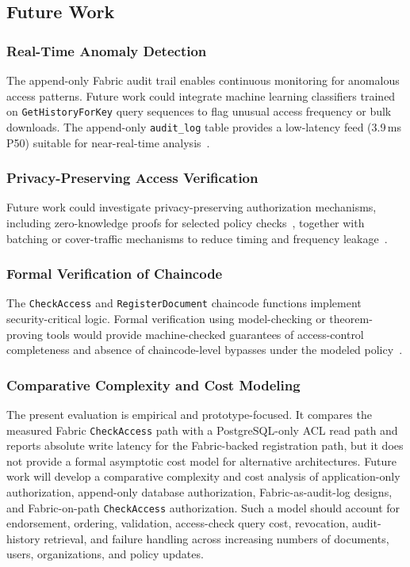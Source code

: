 \documentclass{ieeeaccess}
\begin{document}
\subsection{Future Work}
\label{sec:future_work}

\subsubsection{Real-Time Anomaly Detection}
The append-only Fabric audit trail enables continuous monitoring for
anomalous access patterns. Future work could integrate machine
learning classifiers trained on \texttt{GetHistoryForKey} query
sequences to flag unusual access frequency or bulk downloads. The
append-only \texttt{audit\_log} table provides a low-latency feed
(3.9\,ms P50) suitable for near-real-time
analysis~\cite{siddamsetti2024anomaly}.

\subsubsection{Privacy-Preserving Access Verification}
Future work could investigate privacy-preserving authorization
mechanisms, including zero-knowledge proofs for selected policy
checks~\cite{groth2016}, together with batching or cover-traffic
mechanisms to reduce timing and frequency leakage~\cite{fabricPDCDoc}.

\subsubsection{Formal Verification of Chaincode}
The \texttt{CheckAccess} and \texttt{RegisterDocument} chaincode
functions implement security-critical logic. Formal verification
using model-checking or theorem-proving tools would provide
machine-checked guarantees of access-control completeness and
absence of chaincode-level bypasses under the modeled
policy~\cite{permenev2020verx}.

\subsubsection{Comparative Complexity and Cost Modeling}
The present evaluation is empirical and prototype-focused. It compares the
measured Fabric \texttt{CheckAccess} path with a PostgreSQL-only ACL read path
and reports absolute write latency for the Fabric-backed registration path,
but it does not provide a formal asymptotic cost model for alternative
architectures. Future work will develop a comparative complexity and cost
analysis of application-only authorization, append-only database authorization,
Fabric-as-audit-log designs, and Fabric-on-path \texttt{CheckAccess}
authorization. Such a model should account for endorsement, ordering,
validation, access-check query cost, revocation, audit-history retrieval,
and failure handling across increasing numbers of documents, users,
organizations, and policy updates.
\end{document}
